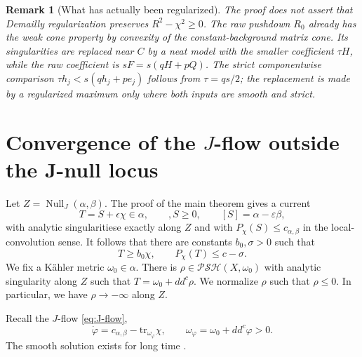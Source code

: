 \documentclass[reqno]{amsart}
\theoremstyle{remark}
\def\tr{\text{tr}}
\newcommand{\ddc}{dd^c}
\newcommand{\JNull}{\operatorname{Null}_{J}}
\newcommand{\Psh}{\mathcal{PSH}}
\newcommand{\cab}{c_{\alpha,\beta}}
\theoremstyle{plain}
\newtheorem{rmk}[thm]{Remark}
\begin{document}
\begin{rmk}[What has actually been regularized]
The proof does not assert that Demailly regularization preserves
$R^2-\chi^2\geq0$.  The raw pushdown $R_0$ already has the weak cone
property by convexity of the constant-background matrix cone.  Its
singularities are replaced near $C$ by a neat model with the smaller
coefficient $\tau H$, while the raw coefficient is
$sF=s(qH+pQ)$.  The strict componentwise comparison
$\tau h_j<s(qh_j+pe_j)$ follows from $\tau=qs/2$; the replacement
is made by a regularized maximum only where both inputs are smooth and
strict.
\end{rmk}




\section{Convergence of the $J$-flow outside the J-null locus}
Let $Z=\JNull(\alpha,\beta).$
The proof of the main theorem gives a current \[
T=S+\epsilon\chi\in \alpha, \qquad, S\ge 0, \qquad [S]=\alpha-\varepsilon\beta,
\]
with analytic singularitiese exactly along $Z$ and with $P_\chi(S)\leq \cab$ in the local-convolution sense. It follows that there are constants $b_0,\sigma>0$ such that \[
T\geq b_0\chi,\qquad P_\chi(T)\le c-\sigma.
\]
We fix a K\"ahler metric $\omega_0\in \alpha$. There is $\rho\in \Psh(X,\omega_0)$ with analytic singularity along $Z$ such that $T=\omega_0+dd^c\rho$. We normalize $\rho$ such that $\rho\leq 0$. In particular, we have $\rho\to -\infty$ along $Z$. 

Recall the $J$-flow \eqref{eq:J-flow},
\begin{equation}
 \dot\varphi=\cab-\tr_{\omega_\varphi}\chi,\qquad
 \omega_\varphi=\omega_0+\ddc\varphi>0.
\end{equation}
The smooth solution exists for long time
\cite[Theorem~1.1]{C04}.
\end{document}
